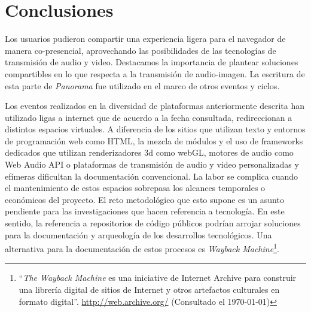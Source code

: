 
\section*{Conclusiones}


Los usuarios pudieron compartir una experiencia ligera para el navegador de manera co-presencial, aprovechando las posibilidades de las tecnologías de transmisión de audio y video. Destacamos la importancia de plantear soluciones compartibles en lo que respecta a la transmisión de audio-imagen. La escritura de esta parte de \textit{Panorama} fue utilizado en el marco de otros eventos y ciclos.






Los eventos realizados en la diversidad de plataformas anteriormente descrita han utilizado ligas a internet que de acuerdo a la fecha consultada, redireccionan a distintos espacios virtuales. A diferencia de los sitios que utilizan texto y entornos de programación web como HTML, la mezcla de módulos y el uso de frameworks dedicados que utilizan renderizadores 3d como webGL, motores de audio como Web Audio API o plataformas de transmisión de audio y video personalizadas y efímeras dificultan la documentación convencional. La labor se complica cuando el mantenimiento de estos espacios sobrepasa los alcances temporales o económicos del proyecto. El reto metodológico que esto supone es un asunto pendiente para las investigaciones que hacen referencia a tecnología. En este sentido, la referencia a repositorios de código públicos podrían arrojar soluciones para la documentación y arqueología de los desarrollos tecnológicos. Una alternativa para la documentación de estos procesos es \textit{Wayback Machine}\footnote{``\textit{The Wayback Machine} es una iniciative de Internet Archive para construir una librería digital de sitios de Internet y otros artefactos culturales en formato digital''. \url{http://web.archive.org/} (Consultado el \today)}. 


